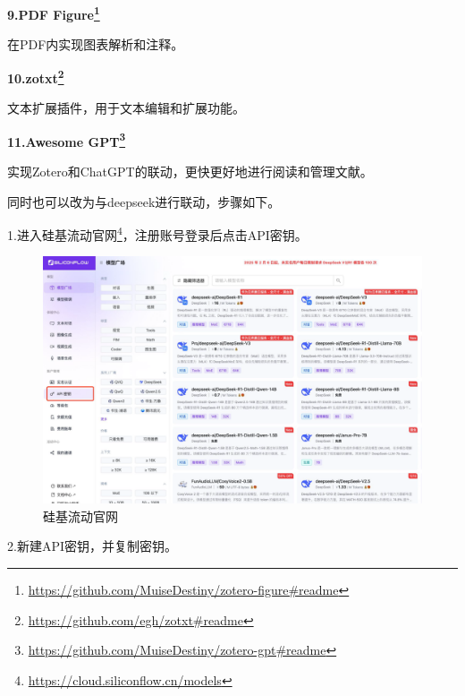 \documentclass[]{ctexbook}
\renewcommand{\href}[2]{#2\footnote{\url{#1}}}
\theoremstyle{definition}
\theoremstyle{definition}
\theoremstyle{definition}
\theoremstyle{definition}
\theoremstyle{remark}
\begin{document}
\textbf{9.\href{https://github.com/MuiseDestiny/zotero-figure\#readme}{PDF Figure}}

在PDF内实现图表解析和注释。

\textbf{10.\href{https://github.com/egh/zotxt\#readme}{zotxt}}

文本扩展插件，用于文本编辑和扩展功能。

\textbf{11.\href{https://github.com/MuiseDestiny/zotero-gpt\#readme}{Awesome GPT}}

实现Zotero和ChatGPT的联动，更快更好地进行阅读和管理文献。

同时也可以改为与deepseek进行联动，步骤如下。

1.进入\href{https://cloud.siliconflow.cn/models}{硅基流动官网}，注册账号登录后点击API密钥。

\begin{figure}

{\centering \includegraphics[width=1\linewidth]{img/zotero/zotero_plugins_deepseek_1} 

}

\caption{硅基流动官网}\label{fig:zotero-plugins-deepseek-1}
\end{figure}

2.新建API密钥，并复制密钥。
\end{document}
